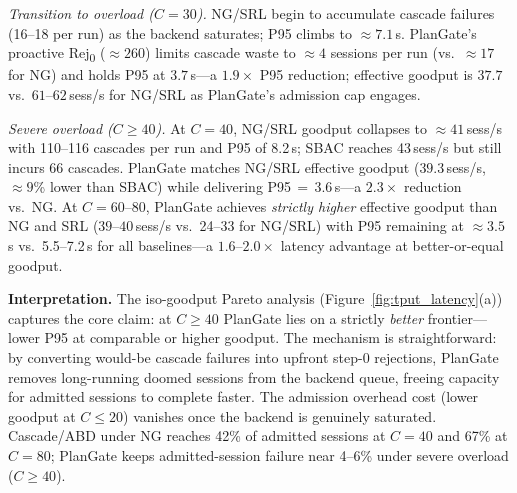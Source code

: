 \documentclass[sigconf,review,anonymous]{acmart}
\begin{document}
\emph{Transition to overload ($C{=}30$).}
NG/SRL begin to accumulate cascade failures (16--18 per run) as the backend saturates;
P95 climbs to ${\approx}7.1$\,s.
PlanGate's proactive Rej\textsubscript{0} (${\approx}260$) limits cascade waste to
${\approx}4$ sessions per run (vs.\ ${\approx}17$ for NG) and holds P95 at $3.7$\,s---a
$\mathbf{1.9\times}$ P95 reduction; effective goodput is $37.7$ vs.\ $61$--$62$\,sess/s
for NG/SRL as PlanGate's admission cap engages.

\emph{Severe overload ($C{\ge}40$).}
At $C{=}40$, NG/SRL goodput collapses to ${\approx}41$\,sess/s with 110--116 cascades per run
and P95 of 8.2\,s; SBAC reaches 43\,sess/s but still incurs 66 cascades.
PlanGate matches NG/SRL effective goodput ($39.3$\,sess/s, ${\approx}9$\% lower than SBAC)
while delivering P95$\,{=}\,3.6$\,s---a $\mathbf{2.3\times}$ reduction vs.\ NG.
At $C{=}60$--$80$, PlanGate achieves \emph{strictly higher} effective goodput than NG and SRL
($39$--$40$\,sess/s vs.\ 24--33 for NG/SRL) with P95 remaining at ${\approx}3.5$\,s vs.\
5.5--7.2\,s for all baselines---a $\mathbf{1.6\text{--}2.0\times}$ latency advantage at
better-or-equal goodput.

\textbf{Interpretation.}
The iso-goodput Pareto analysis (Figure~\ref{fig:tput_latency}(a)) captures the core claim:
at $C{\ge}40$ PlanGate lies on a strictly \emph{better} frontier---lower P95 at
comparable or higher goodput.
The mechanism is straightforward: by converting would-be cascade failures into upfront
step-0 rejections, PlanGate removes long-running doomed sessions from the backend queue,
freeing capacity for admitted sessions to complete faster.
The admission overhead cost (lower goodput at $C{\le}20$) vanishes once the backend is
genuinely saturated.
Cascade/ABD under NG reaches 42\% of admitted sessions at $C{=}40$ and 67\% at $C{=}80$;
PlanGate keeps admitted-session failure near 4--6\% under severe overload ($C{\ge}40$).
\end{document}
